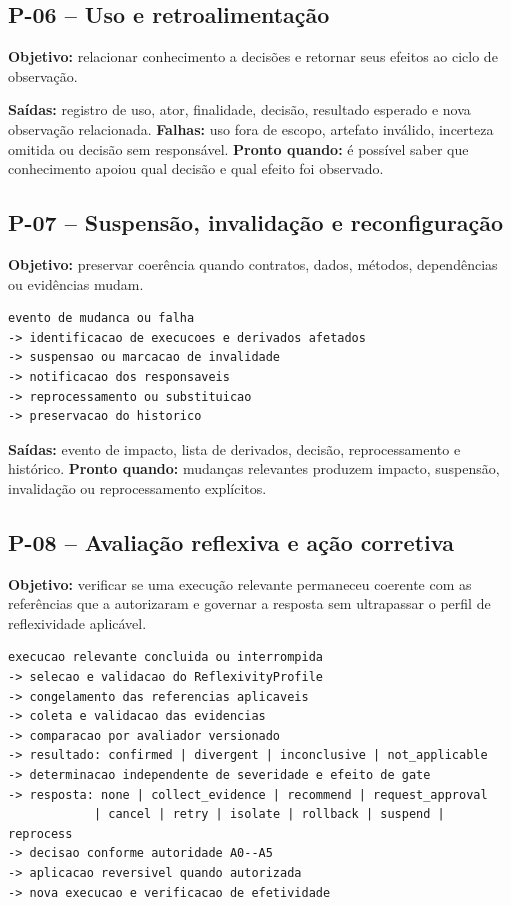 \documentclass[11pt,a4paper,oneside]{article}
\begin{document}
\subsection{P-06 -- Uso e retroalimentação}
\textbf{Objetivo:} relacionar conhecimento a decisões e retornar seus efeitos ao ciclo de observação.

\textbf{Saídas:} registro de uso, ator, finalidade, decisão, resultado esperado e nova observação relacionada.  
\textbf{Falhas:} uso fora de escopo, artefato inválido, incerteza omitida ou decisão sem responsável.  
\textbf{Pronto quando:} é possível saber que conhecimento apoiou qual decisão e qual efeito foi observado.

\subsection{P-07 -- Suspensão, invalidação e reconfiguração}
\textbf{Objetivo:} preservar coerência quando contratos, dados, métodos, dependências ou evidências mudam.

\begin{lstlisting}
evento de mudanca ou falha
-> identificacao de execucoes e derivados afetados
-> suspensao ou marcacao de invalidade
-> notificacao dos responsaveis
-> reprocessamento ou substituicao
-> preservacao do historico
\end{lstlisting}

\textbf{Saídas:} evento de impacto, lista de derivados, decisão, reprocessamento e histórico.  
\textbf{Pronto quando:} mudanças relevantes produzem impacto, suspensão, invalidação ou reprocessamento explícitos.

\subsection{P-08 -- Avaliação reflexiva e ação corretiva}
\textbf{Objetivo:} verificar se uma execução relevante permaneceu coerente com as referências que a autorizaram e governar a resposta sem ultrapassar o perfil de reflexividade aplicável.

\begin{lstlisting}
execucao relevante concluida ou interrompida
-> selecao e validacao do ReflexivityProfile
-> congelamento das referencias aplicaveis
-> coleta e validacao das evidencias
-> comparacao por avaliador versionado
-> resultado: confirmed | divergent | inconclusive | not_applicable
-> determinacao independente de severidade e efeito de gate
-> resposta: none | collect_evidence | recommend | request_approval
            | cancel | retry | isolate | rollback | suspend | reprocess
-> decisao conforme autoridade A0--A5
-> aplicacao reversivel quando autorizada
-> nova execucao e verificacao de efetividade
\end{lstlisting}
\end{document}
